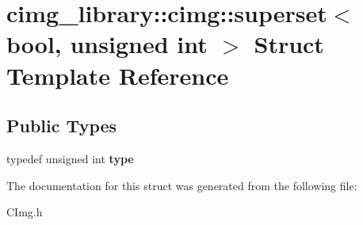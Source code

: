 \hypertarget{structcimg__library_1_1cimg_1_1superset_3_01bool_00_01unsigned_01int_01_4}{\section{cimg\-\_\-library\-:\-:cimg\-:\-:superset$<$ bool, unsigned int $>$ Struct Template Reference}
\label{structcimg__library_1_1cimg_1_1superset_3_01bool_00_01unsigned_01int_01_4}
}
\subsection*{Public Types}
\begin{DoxyCompactItemize}
\item 
\hypertarget{structcimg__library_1_1cimg_1_1superset_3_01bool_00_01unsigned_01int_01_4_a561907f4e874363700e7adf95ce31cd4}{typedef unsigned int {\bfseries type}}\label{structcimg__library_1_1cimg_1_1superset_3_01bool_00_01unsigned_01int_01_4_a561907f4e874363700e7adf95ce31cd4}

\end{DoxyCompactItemize}


The documentation for this struct was generated from the following file\-:\begin{DoxyCompactItemize}
\item 
C\-Img.\-h\end{DoxyCompactItemize}
